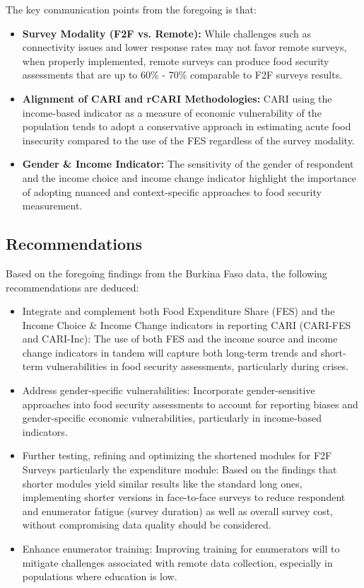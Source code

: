 \documentclass[11pt,harvard]{article}
\begin{document}
	The key communication points from the foregoing is that:
	\begin{itemize}[left=2.5em]
		\item \textbf{Survey Modality (F2F vs. Remote):} While challenges such as connectivity issues and lower response rates may not favor remote surveys, when properly implemented, remote surveys can produce food security assessments that are up to 60\% - 70\% comparable to F2F surveys results.
		\item \textbf{Alignment of CARI and rCARI Methodologies:} CARI using the income-based indicator as a measure of economic vulnerability of the population tends to adopt a conservative approach in estimating acute food insecurity compared to the use of the FES regardless of the survey modality.
		\item \textbf{Gender \& Income Indicator:} The sensitivity of the gender of respondent and the income choice and income change indicator highlight the importance of adopting nuanced and context-specific approaches to food security measurement.
	\end{itemize}
	
	
	\subsection{Recommendations}
	Based on the foregoing findings from the Burkina Faso data, the following recommendations are deduced:
	\begin{itemize}
		\item Integrate and complement both Food Expenditure Share (FES) and the Income Choice \& Income Change indicators in reporting CARI (CARI-FES and CARI-Inc): The use of both FES and the income source and income change indicators in tandem will capture both long-term trends and short-term vulnerabilities in food security assessments, particularly during crises.
		\item Address gender-specific vulnerabilities: Incorporate gender-sensitive approaches into food security assessments to account for reporting biases and gender-specific economic vulnerabilities, particularly in income-based indicators.
		\item Further testing, refining and optimizing the shortened modules for F2F Surveys particularly the expenditure module: Based on the findings that shorter modules yield similar results like the standard long ones, implementing shorter versions in face-to-face surveys to reduce respondent and enumerator fatigue (survey duration) as well as overall survey cost, without compromising data quality should be considered.
		\item Enhance enumerator training: Improving training for enumerators will to mitigate challenges associated with remote data collection, especially in populations where education is low.
		
	\end{itemize}	
\end{document}
